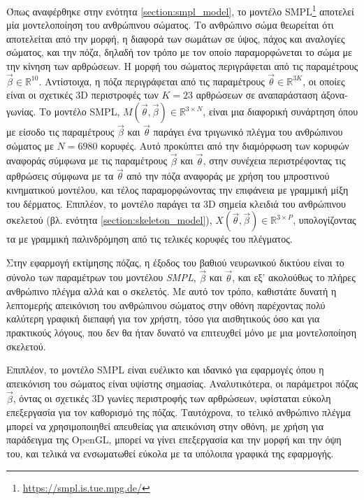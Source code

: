 Όπως αναφέρθηκε στην ενότητα \ref{section:smpl_model}, το μοντέλο SMPL\footnote{\href{https://smpl.is.tue.mpg.de/}{https://smpl.is.tue.mpg.de/}} αποτελεί μία μοντελοποίηση του ανθρώπινου σώματος. Το ανθρώπινο σώμα θεωρείται ότι αποτελείται από την μορφή, η διαφορά των σωμάτων σε ύψος, πάχος και αναλογίες σώματος, και την πόζα, δηλαδή τον τρόπο με τον οποίο παραμορφώνεται το σώμα με την κίνηση των αρθρώσεων. Η μορφή του σώματος περιγράφεται από τις παραμέτρους $\vec{\beta} \in \mathbb{R}^{10}$. Αντίστοιχα, η πόζα περιγράφεται από τις παραμέτρους $\vec{\theta} \in \mathbb{R}^{3K}$, οι οποίες είναι οι σχετικές 3D περιστροφές των $K = 23$ αρθρώσεων σε αναπαράσταση άξονα-γωνίας. Το μοντέλο SMPL, $M(\vec{\theta},\vec{\beta}) \in \mathbb{R}^{3 \times N}$, είναι μια διαφορική συνάρτηση όπου με είσοδο τις παραμέτρους $\vec{\beta}$ και $\vec{\theta}$ παράγει ένα τριγωνικό πλέγμα του ανθρώπινου σώματος με $Ν = 6980$ κορυφές. Αυτό προκύπτει από την διαμόρφωση των κορυφών αναφοράς σύμφωνα με τις παραμέτρους $\vec{\beta}$ και $\vec{\theta}$, στην συνέχεια περιστρέφοντας τις αρθρώσεις σύμφωνα με τα $\vec{\theta}$ από την πόζα αναφοράς με χρήση του μπροστινού κινηματικού μοντέλου, και τέλος παραμορφώνοντας την επιφάνεια με γραμμική μίξη του δέρματος. Επιπλέον, το μοντέλο παράγει τα 3D σημεία κλειδιά του ανθρώπινου σκελετού (βλ. ενότητα \ref{section:skeleton_model}), $X(\vec{\theta},\vec{\beta}) \in \mathbb{R}^{3 \times P}$, υπολογίζοντας τα με γραμμική παλινδρόμηση από τις τελικές κορυφές του πλέγματος.

Στην εφαρμογή εκτίμησης πόζας, η έξοδος του βαθιού νευρωνικού δικτύου είναι το σύνολο των παραμέτρων του μοντέλου \textsl{SMPL}, $\vec{\beta}$ και $\vec{\theta}$, και εξ' ακολούθως το πλήρες ανθρώπινο πλέγμα αλλά και ο σκελετός. Με αυτό τον τρόπο, καθιστάτε δυνατή η λεπτομερής απεικόνιση του ανθρώπινου σώματος στην οθόνη παρέχοντας πολύ καλύτερη γραφική διεπαφή για τον χρήστη, τόσο για αισθητικούς όσο και για πρακτικούς λόγους, που δεν θα ήταν δυνατό να επιτευχθεί μόνο με μια μοντελοποίηση σκελετού.

Επιπλέον, το μοντέλο SMPL είναι ευέλικτο και ιδανικό για εφαρμογές όπου η απεικόνιση του σώματος είναι υψίστης σημασίας. Αναλυτικότερα, οι παράμετροι πόζας $\vec{\beta}$, όντας οι σχετικές 3D γωνίες περιστροφής των αρθρώσεων, υφίσταται εύκολη επεξεργασία για τον καθορισμό της πόζας. Ταυτόχρονα, το τελικό ανθρώπινο πλέγμα μπορεί να χρησιμοποιηθεί απευθείας για απεικόνιση στην οθόνη, με χρήση για παράδειγμα της OpenGL, μπορεί να γίνει επεξεργασία και την μορφή και την όψη του, και τελικά να ενσωματωθεί εύκολα με τα υπόλοιπα γραφικά της εφαρμογής.


